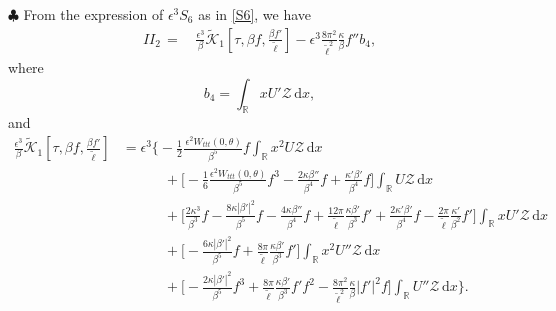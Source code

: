 \documentclass[10pt, reqno]{amsart}
\numberwithin{equation}{section}
\theoremstyle{definition}
\begin{document}
{\smallskip\noindent $\clubsuit$
 From the expression of $\epsilon^3 S_{6}$ as in \eqref{S6}, we have
\begin{align}\label{ESTIMATEII2}
II_{2}
\,=\,&\frac{\epsilon^3}{\beta}\tilde{\mathcal K}_1\left[\tau, {\beta f}, \frac{\beta{ f}'}{\tilde\ell} \right] -\epsilon^3\frac{8\pi^2}{{\tilde\ell}^2}\frac{\kappa}{\beta} f''b_4,
\end{align}
where
$$
b_4 = \int_{\mathbb R} xU' \mathcal Z \,{\mathrm d}x,
$$
and
\begin{align*}
 \frac{\epsilon^3}{\beta}\tilde{\mathcal K}_1\left[\tau, {\beta f}, \frac{\beta{ f}'}{\tilde\ell} \right]
& = \epsilon^3\Bigg\{
 - \frac{1}{2} \frac{\,\epsilon^2 W_{ttt}(0, \theta)}{\beta^5}f \int_{\mathbb R} x^2 U \mathcal Z\,{\mathrm d}x
 \nonumber\\[2mm]
 & \qquad \quad +
\Big[- \frac{1}{6} \frac{\epsilon^2W_{ttt}(0, \theta)}{\beta^5}f^3
 -\frac{2\kappa\beta''}{\beta^4} f +\frac{\kappa'\beta'} {\beta^4} f\Big]\int_{\mathbb R} U\mathcal Z\,{\mathrm d}x
\nonumber\\[2mm]
 &\qquad \quad + \Big[
 \frac{2\kappa^3}{\beta^3}f
 -\frac{8\kappa|\beta'|^2}{\beta^5} f
 -\frac{4\kappa\beta''}{\beta^4}f
+\frac{12\pi }{ {\tilde\ell}}\frac{\kappa\beta'}{\beta^3} f'
+\frac{2\kappa'\beta'}{\beta^4}f
- \frac{2\pi}{{\tilde\ell}} \frac{\kappa'}{\beta^2} f'\Big] \int_{\mathbb R} xU'\mathcal Z\,{\mathrm d}x
\nonumber\\[2mm]
 & \qquad \quad + \Big[ -\frac{6\kappa|\beta'|^2}{\beta^5}f
 +\frac{8\pi}{ {\tilde\ell}}\frac{\kappa\beta'}{\beta^3} f'\Big] \int_{\mathbb R} x^2 U''\mathcal Z\,{\mathrm d}x
\nonumber\\[2mm]
&\qquad \quad+ \Big[ -\frac{2\kappa|\beta'|^2}{\beta^5}f^3
 +\frac{8\pi}{ {\tilde\ell}} \frac{\kappa\beta'}{\beta^3} f' f^2
 -\frac{8\pi^2} {{\tilde\ell}^2}\frac{\kappa}{\beta} |f'|^2 f \Big]\int_{\mathbb R} U''\mathcal Z\,{\mathrm d}x
 \Bigg\}.
\end{align*}






}
\end{document}
